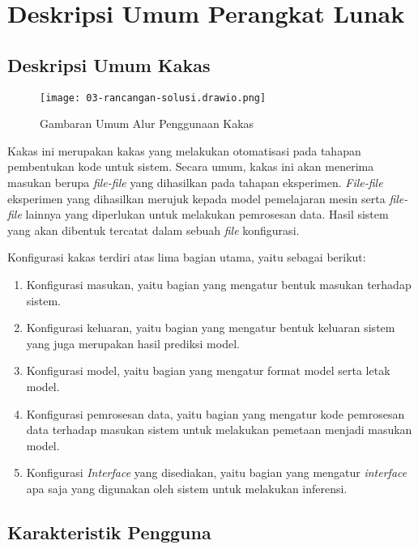 \section{Deskripsi Umum Perangkat Lunak}

\subsection{Deskripsi Umum Kakas}

\begin{figure}[ht]
    \centering
    \texttt{[image: 03-rancangan-solusi.drawio.png]}
    \caption{Gambaran Umum Alur Penggunaan Kakas}\label{fig:appendix-tool-design}
\end{figure}

Kakas ini merupakan kakas yang melakukan otomatisasi pada tahapan pembentukan kode untuk sistem.
Secara umum, kakas ini akan menerima masukan berupa \textit{file-file} yang dihasilkan pada tahapan eksperimen.
\textit{File-file} eksperimen yang dihasilkan merujuk kepada model pemelajaran mesin serta \textit{file-file} lainnya yang diperlukan untuk melakukan pemrosesan data.
Hasil sistem yang akan dibentuk tercatat dalam sebuah \textit{file} konfigurasi.

Konfigurasi kakas terdiri atas lima bagian utama, yaitu sebagai berikut:

\begin{enumerate}
	\item Konfigurasi masukan, yaitu bagian yang mengatur bentuk masukan terhadap sistem.
	\item Konfigurasi keluaran, yaitu bagian yang mengatur bentuk keluaran sistem yang juga merupakan hasil prediksi model.
	\item Konfigurasi model, yaitu bagian yang mengatur format model serta letak model.
	\item Konfigurasi pemrosesan data, yaitu bagian yang mengatur kode pemrosesan data terhadap masukan sistem untuk melakukan pemetaan menjadi masukan model.
	\item Konfigurasi \textit{Interface} yang disediakan, yaitu bagian yang mengatur \textit{interface} apa saja yang digunakan oleh sistem untuk melakukan inferensi. 
\end{enumerate}

\subsection{Karakteristik Pengguna}

